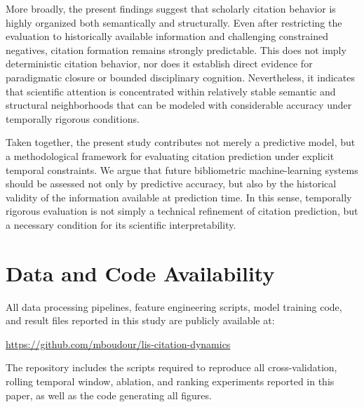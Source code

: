 \documentclass[11pt,a4paper]{article}
\begin{document}
More broadly, the present findings suggest that scholarly citation behavior is highly organized both semantically and structurally. Even after restricting the evaluation to historically available information and challenging constrained negatives, citation formation remains strongly predictable. This does not imply deterministic citation behavior, nor does it establish direct evidence for paradigmatic closure or bounded disciplinary cognition. Nevertheless, it indicates that scientific attention is concentrated within relatively stable semantic and structural neighborhoods that can be modeled with considerable accuracy under temporally rigorous conditions.

Taken together, the present study contributes not merely a predictive model, but a methodological framework for evaluating citation prediction under explicit temporal constraints. We argue that future bibliometric machine-learning systems should be assessed not only by predictive accuracy, but also by the historical validity of the information available at prediction time. In this sense, temporally rigorous evaluation is not simply a technical refinement of citation prediction, but a necessary condition for its scientific interpretability.

\section*{Data and Code Availability}
All data processing pipelines, feature engineering scripts, model training
code, and result files reported in this study are publicly available at:
\begin{center}
\url{https://github.com/mboudour/lis-citation-dynamics}
\end{center}
The repository includes the scripts required to reproduce all
cross-validation, rolling temporal window, ablation, and ranking
experiments reported in this paper, as well as the code generating
all figures.



\end{document}
